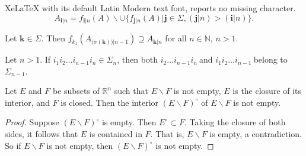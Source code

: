 \documentclass[10pt,a4paper]{amsart}
\begin{document}
XeLaTeX with its default Latin Modern text font, reports no missing character.
\begin{equation}
A_{\mathbf{i}|n}=f_{\mathbf{i}|n}(A)\backslash\cup\{f_{\mathbf{j}%
|n}(A)|\mathbf{j\in}\Sigma,(\mathbf{j}|n)>(\mathbf{i}|n)\}.\label{coreydef}%
\end{equation}

\begin{lemma}
\label{topshiftlemma}Let $\mathbf{k}\in\Sigma.$ Then $f_{k_{1}}\left(
A_{(\sigma\left(  \mathbf{k}\right)  \mathbf{)|}n-1}\right)  \supseteq
A_{\mathbf{k|}n}$ for all $n\in\mathbb{N}$, $n>1$.
\end{lemma}

\begin{lemma}
\label{smallerlemma}Let $n>1.$ If $i_{1}i_{2}\dots i_{n-1}i_{n}\in\Sigma_{n}$,
then both $i_{2}\dots i_{n-1}i_{n}\ $and $i_{1}i_{2}\dots i_{n-1}\ $belong to
$\Sigma_{n-1}.$
\end{lemma}

\begin{lemma}
\label{lemmafour} Let $E$ and $F$ be subsets of $\mathbb{R}^{n}$ such that
$E\backslash F$ is not empty, $E$ is the closure of its interior, and $F$ is
closed. Then the interior $\left(  E\backslash F\right)  ^{\circ}$ of
$E\backslash F$ is not empty.

\begin{proof}
Suppose $\left(  E\backslash F\right)  ^{\circ}$ is empty. Then $E^{\circ
}\subset F.$ Taking the closure of both sides, it follows that $E$ is
contained in $F$. That is, $E\backslash F$ is empty, a contradiction. So if
$E\backslash F$ is not empty, then $\left(  E\backslash F\right)  ^{\circ}$ is
not empty.
\end{proof}
\end{lemma}
\end{document}
